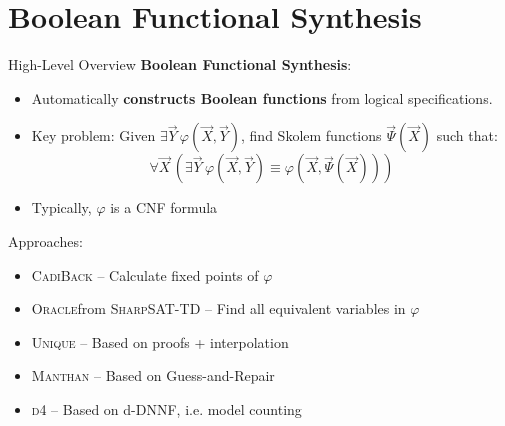 \documentclass[aspectratio=169]{beamer}
\begin{document}
\section{Boolean Functional Synthesis}
\begin{frame}{High-Level Overview}
  \textbf{Boolean Functional Synthesis}:
  \begin{itemize}
    \item Automatically \textbf{constructs Boolean functions} from logical specifications.
    \item Key problem: Given \(\exists \vec{Y}\, \varphi(\vec{X}, \vec{Y})\),
        find Skolem functions \(\vec{\Psi}(\vec{X})\) such that:
        \[
            \forall \vec{X}\, \left( \exists \vec{Y}\, \varphi(\vec{X}, \vec{Y}) \equiv \varphi(\vec{X}, \vec{\Psi}(\vec{X})) \right)
        \]
    \item Typically, \(\varphi\) is a CNF formula
\end{itemize}
\bigskip

Approaches:
\begin{itemize}
    \item \textsc{CadiBack} -- Calculate fixed points of \(\varphi\)
    \item \textsc{Oracle}from \textsc{SharpSAT-TD} -- Find all equivalent variables in \(\varphi\)
    \item \textsc{Unique} -- Based on proofs + interpolation
    \item \textsc{Manthan} -- Based on Guess-and-Repair
    \item \textsc{d4} -- Based on d-DNNF, i.e. model counting
\end{itemize}
\bigskip
\end{frame}
\end{document}
